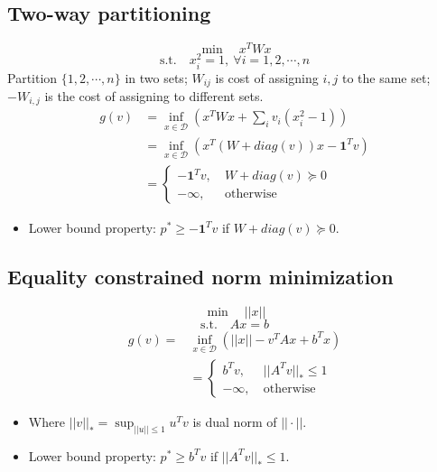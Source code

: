 \subsection{Two-way partitioning}
$$
\min \quad x^TWx
$$
$$
\text{s.t.} \quad
    x_i^2 = 1, \ \forall i = 1, 2, \cdots, n
$$
Partition $\{1, 2, \cdots, n\}$ in two sets; $W_{ij}$ is cost of assigning $i, j$ to the same set; $-W_{i, j}$ is the cost of assigning to different sets.
\begin{align}
    g(v) & = \inf_{x \in \mathcal{D}} (x^TWx + \sum_{i} v_i (x_i^2 - 1)) \nonumber \\    
    & = \inf_{x \in \mathcal{D}} (x^T(W + diag(v))x - \textbf{1}^Tv) \nonumber \\
    & = \begin{cases}
        - \textbf{1}^Tv, \ & W + diag(v) \succcurlyeq 0 \\
        - \infty, \ & \text{otherwise}
    \end{cases} \nonumber
\end{align}
\begin{itemize}
    \item Lower bound property: $p^* \ge - \textbf{1}^Tv$ if $W + diag(v) \succcurlyeq 0$.
\end{itemize}
\pagebreak

\subsection{Equality constrained norm minimization}
$$
\min \quad ||x||
$$
$$
\text{s.t.} \quad
    Ax = b
$$
\begin{align}
    g(v) = & \inf_{x \in \mathcal{D}} (||x|| - v^TAx + b^Tx) \nonumber \\
    & = \begin{cases}
        b^Tv, \ & ||A^Tv||_* \le 1 \\
        - \infty, \ & \text{otherwise}
    \end{cases} \nonumber
\end{align}
\begin{itemize}
    \item Where $||v||_* = \sup_{||u|| \le 1}u^Tv$ is dual norm of $||\cdot||$.
    \item Lower bound property: $p^* \ge b^Tv$ if $||A^Tv||_* \le 1$.
\end{itemize}

